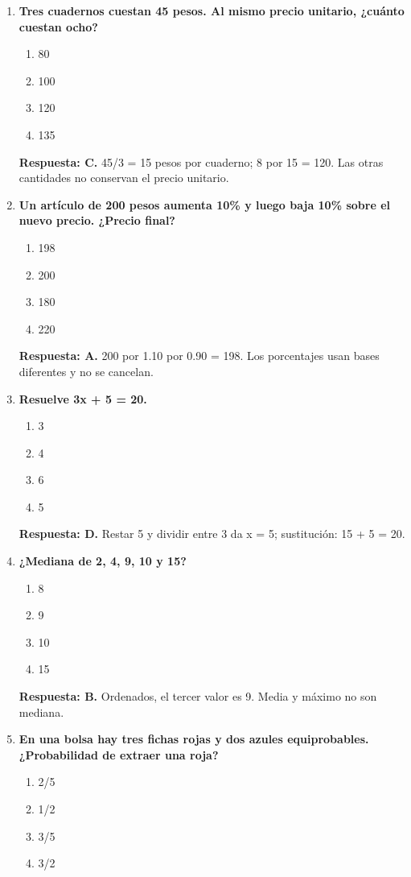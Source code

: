 \begin{enumerate}
\item\textbf{Tres cuadernos cuestan 45 pesos. Al mismo precio unitario, ¿cuánto cuestan ocho?}
\begin{enumerate}[label=\Alph*)]
\item 80
\item 100
\item 120
\item 135
\end{enumerate}
\textbf{Respuesta: C.} 45/3 = 15 pesos por cuaderno; 8 por 15 = 120. Las otras cantidades no conservan el precio unitario.
\item\textbf{Un artículo de 200 pesos aumenta 10\% y luego baja 10\% sobre el nuevo precio. ¿Precio final?}
\begin{enumerate}[label=\Alph*)]
\item 198
\item 200
\item 180
\item 220
\end{enumerate}
\textbf{Respuesta: A.} 200 por 1.10 por 0.90 = 198. Los porcentajes usan bases diferentes y no se cancelan.
\item\textbf{Resuelve 3x + 5 = 20.}
\begin{enumerate}[label=\Alph*)]
\item 3
\item 4
\item 6
\item 5
\end{enumerate}
\textbf{Respuesta: D.} Restar 5 y dividir entre 3 da x = 5; sustitución: 15 + 5 = 20.
\item\textbf{¿Mediana de 2, 4, 9, 10 y 15?}
\begin{enumerate}[label=\Alph*)]
\item 8
\item 9
\item 10
\item 15
\end{enumerate}
\textbf{Respuesta: B.} Ordenados, el tercer valor es 9. Media y máximo no son mediana.
\item\textbf{En una bolsa hay tres fichas rojas y dos azules equiprobables. ¿Probabilidad de extraer una roja?}
\begin{enumerate}[label=\Alph*)]
\item 2/5
\item 1/2
\item 3/5
\item 3/2

\end{enumerate}
\end{enumerate}
